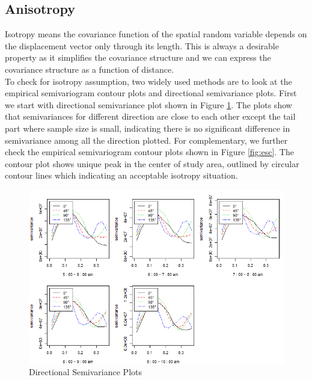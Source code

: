 \documentclass[hidelinks,12pt]{article}
\begin{document}
\subsection{Anisotropy}\label{sec:anis}
Isotropy means the covariance function of the spatial random variable depends on the displacement vector only through its length. This is always a desirable property as it simplifies the covariance structure and we can express the covariance structure as a function of distance. \\

To check for isotropy assumption, two widely used methods are to look at the empirical semivariogram contour plots and directional semivariance plots. First we start with directional semivariance plot shown in Figure \ref{fig:dir_semi}. The plots show that semivariances for different direction are close to each other except the tail part where sample size is small, indicating there is no significant difference in semivariance among all the direction plotted. For complementary, we further check the empirical semivariogram contour plots shown in Figure \ref{fig:esc}. The contour plot shows unique peak in the center of study area, outlined by circular contour lines which indicating an acceptable isotropy situation.

\begin{figure}[!ht]
		\includegraphics[width=\textwidth]{dir_semi.png}
		\caption{Directional Semivariance Plots\label{fig:dir_semi}}
\end{figure}
\FloatBarrier
\end{document}
